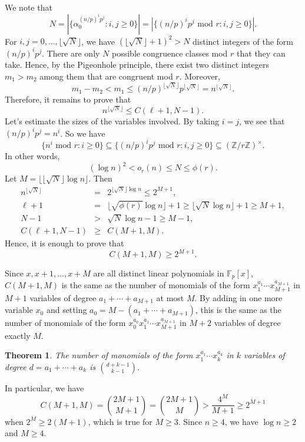 \documentclass{article}
\def\Z{{\mathbb Z}}
\def\F{{\mathbb F}}
\def\Z{{\mathbb Z}}
\def\F{{\mathbb F}}
\newtheorem{theorem}[subsection]{Theorem}
\begin{document}
We note that $$N = |\{\alpha_0^{(n/p)^ip^j}\colon i,j\geq 0\}| = |\{(n/p)^ip^j\mbox{ mod }r\colon i,j\geq 0\}|.$$
For $i,j = 0,\ldots,\lfloor\sqrt{N}\rfloor$, we have $(\lfloor\sqrt{N}\rfloor + 1)^2 > N$ distinct integers of the form $(n/p)^ip^j$. There are only $N$ possible congruence classes mod $r$ that they can take. Hence, by the Pigeonhole principle, there exist two distinct integers $m_1>m_2$ among them that are congruent mod $r$. Moreover, $$m_1 - m_2 < m_1 \leq (n/p)^{\lfloor\sqrt{N}\rfloor}p^{\lfloor\sqrt{N}\rfloor} = n^{\lfloor\sqrt{N}\rfloor}.$$
Therefore, it remains to prove that $$n^{\lfloor\sqrt{N}\rfloor}\leq C(\ell+1, N-1).$$
Let's estimate the sizes of the variables involved. By taking $i = j$, we see that $(n/p)^ip^j = n^i$. So we have
$$\{n^i\mbox{ mod }r\colon i\geq 0\} \subseteq \{(n/p)^ip^j\mbox{ mod }r\colon i,j\geq 0\} \subseteq (\Z/r\Z)^\times.$$
In other words,
$$(\log n)^2 < o_r(n) \leq N \leq \phi(r).$$
Let $M = \lfloor\lfloor\sqrt{N}\rfloor\log n\rfloor.$ Then
\begin{eqnarray*}
    n^{\lfloor\sqrt{N}\rfloor} &=& 2^{\lfloor\sqrt{N}\rfloor\log n} \leq 2^{M+1},\\
    \ell + 1  &=& \lfloor\sqrt{\phi(r)}\log n\rfloor + 1 \geq \lfloor \sqrt{N}\log n \rfloor + 1 \geq M + 1,\\
    N - 1 &> &\sqrt{N}\log n - 1 \geq M - 1,\\
    C(\ell+1,N-1) &\geq& C(M+1, M).
\end{eqnarray*}
Hence, it is enough to prove that $$C(M+1, M) \geq 2^{M+1}.$$


Since $x, x+1,\ldots,x+M$ are all distinct linear polynomials in $\F_p[x]$, $C(M+1, M)$ is the same as the number of monomials of the form $x_1^{a_1}\cdots x_{M+1}^{a_{M+1}}$ in $M+1$ variables of degree $a_1 + \cdots + a_{M+1}$ at most $M$. By adding in one more variable $x_0$ and setting $a_0 = M - (a_1 + \cdots + a_{M+1})$, this is the same as the number of monomials of the form $x_0^{a_0}x_1^{a_1}\cdots x_{M+1}^{a_{M+1}}$ in $M+2$ variables of degree exactly $M$.

\begin{theorem}\label{thm:sb}
    The number of monomials of the form $x_1^{a_1}\cdots x_k^{a_k}$ in $k$ variables of degree $d = a_1 + \cdots + a_k$ is $\binom{d+k-1}{k-1}.$
\end{theorem}

In particular, we have
$$C(M+1, M) = \binom{2M+1}{M+1} = \binom{2M+1}{M} > \frac{4^M}{M+1}\geq 2^{M+1}$$
when $2^M \geq 2(M+1)$, which is true for $M\geq3$. Since $n\geq 4$, we have $\log n \geq 2$ and $M\geq 4$.
\end{document}
